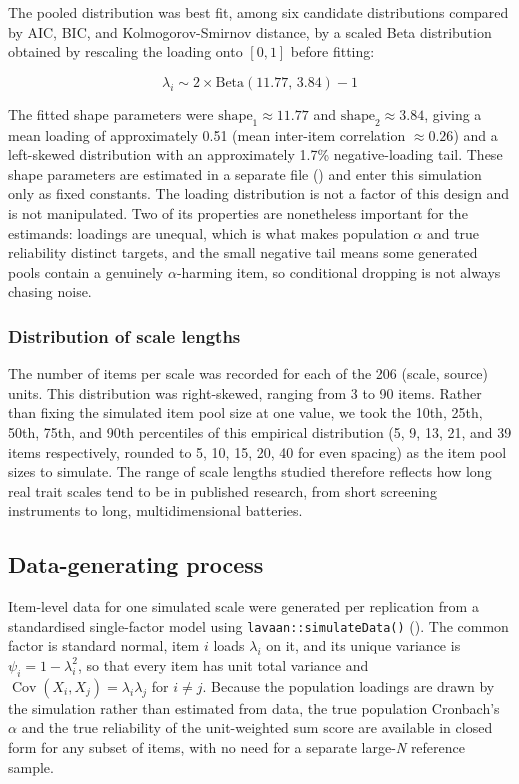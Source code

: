 \documentclass[
  nonatbib,
  authoryear,
  preprint]{elsarticle}
\begin{document}
The pooled distribution was best fit, among six candidate distributions
compared by AIC, BIC, and Kolmogorov-Smirnov distance, by a scaled Beta
distribution obtained by rescaling the loading onto \([0, 1]\) before
fitting:

\[\lambda_i \sim 2 \times \mathrm{Beta}(11.77,\, 3.84) - 1\]

The fitted shape parameters were \(\mathrm{shape}_1 \approx 11.77\) and
\(\mathrm{shape}_2 \approx 3.84\), giving a mean loading of
approximately 0.51 (mean inter-item correlation \(\approx 0.26\)) and a
left-skewed distribution with an approximately 1.7\% negative-loading
tail. These shape parameters are estimated in a separate file
() and enter this
simulation only as fixed constants. The loading distribution is not a
factor of this design and is not manipulated. Two of its properties are
nonetheless important for the estimands: loadings are unequal, which is
what makes population \(\alpha\) and true reliability distinct targets,
and the small negative tail means some generated pools contain a
genuinely \(\alpha\)-harming item, so conditional dropping is not always
chasing noise.

\subsubsection{Distribution of scale
lengths}\label{distribution-of-scale-lengths}

The number of items per scale was recorded for each of the 206 (scale,
source) units. This distribution was right-skewed, ranging from 3 to 90
items. Rather than fixing the simulated item pool size at one value, we
took the 10th, 25th, 50th, 75th, and 90th percentiles of this empirical
distribution (5, 9, 13, 21, and 39 items respectively, rounded to 5, 10,
15, 20, 40 for even spacing) as the item pool sizes to simulate. The
range of scale lengths studied therefore reflects how long real trait
scales tend to be in published research, from short screening
instruments to long, multidimensional batteries.

\subsection{Data-generating process}\label{data-generating-process}

Item-level data for one simulated scale were generated per replication
from a standardised single-factor model using
\texttt{lavaan::simulateData()}
(). The common factor
is standard normal, item \(i\) loads \(\lambda_i\) on it, and its unique
variance is \(\psi_i = 1 - \lambda_i^2\), so that every item has unit
total variance and
\(\operatorname{Cov}(X_i, X_j) = \lambda_i \lambda_j\) for \(i \neq j\).
Because the population loadings are drawn by the simulation rather than
estimated from data, the true population Cronbach's \(\alpha\) and the
true reliability of the unit-weighted sum score are available in closed
form for any subset of items, with no need for a separate large-\emph{N}
reference sample.
\end{document}
